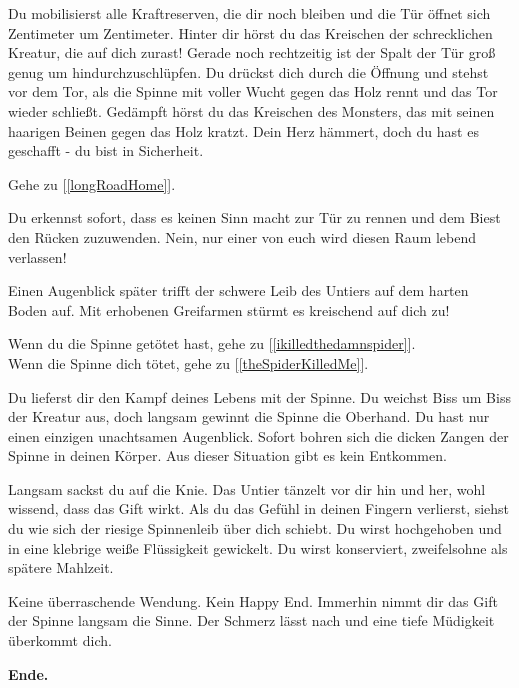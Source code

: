 Du mobilisierst alle Kraftreserven, die dir noch bleiben und die Tür öffnet sich Zentimeter um Zentimeter. Hinter dir hörst du das Kreischen der schrecklichen Kreatur, die auf dich zurast! Gerade noch rechtzeitig ist der Spalt der Tür groß genug um hindurchzuschlüpfen. Du drückst dich durch die Öffnung und stehst vor dem Tor, als die Spinne mit voller Wucht gegen das Holz rennt und das Tor wieder schließt. Gedämpft hörst du das Kreischen des Monsters, das mit seinen haarigen Beinen gegen das Holz kratzt. Dein Herz hämmert, doch du hast es geschafft - du bist in Sicherheit.

Gehe zu [\ref{longRoadHome}].


Du erkennst sofort, dass es keinen Sinn macht zur Tür zu rennen und dem Biest den Rücken zuzuwenden. Nein, nur einer von euch wird diesen Raum lebend verlassen!

Einen Augenblick später trifft der schwere Leib des Untiers auf dem harten Boden auf. Mit erhobenen Greifarmen stürmt es kreischend auf dich zu!


Wenn du die Spinne getötet hast, gehe zu [\ref{ikilledthedamnspider}].
\\Wenn die Spinne dich tötet, gehe zu [\ref{theSpiderKilledMe}].


Du lieferst dir den Kampf deines Lebens mit der Spinne. Du weichst Biss um Biss der Kreatur aus, doch langsam gewinnt die Spinne die Oberhand. Du hast nur einen einzigen unachtsamen Augenblick. Sofort bohren sich die dicken Zangen der Spinne in deinen Körper. Aus dieser Situation gibt es kein Entkommen.

Langsam sackst du auf die Knie. Das Untier tänzelt vor dir hin und her, wohl wissend, dass das Gift wirkt. Als du das Gefühl in deinen Fingern verlierst, siehst du wie sich der riesige Spinnenleib über dich schiebt. Du wirst hochgehoben und in eine klebrige weiße Flüssigkeit gewickelt. Du wirst konserviert, zweifelsohne als spätere Mahlzeit.

Keine überraschende Wendung. Kein Happy End. Immerhin nimmt dir das Gift der Spinne langsam die Sinne. Der Schmerz lässt nach und eine tiefe Müdigkeit überkommt dich.

\textbf{Ende.}


